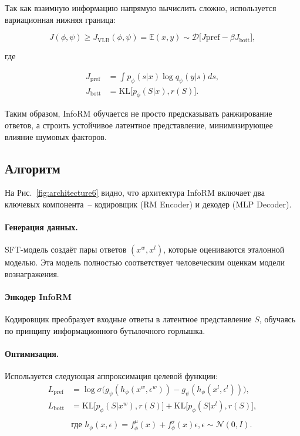Так как взаимную информацию напрямую вычислить сложно, используется вариационная нижняя граница:

\begin{equation}
J(\phi, \psi) \ge J_{\mathrm{VLB}}(\phi, \psi) = \mathbb{E}{(x, y) \sim \mathcal{D}}
\Big[ J{\mathrm{pref}} - \beta J_{\mathrm{bott}} \Big],
\end{equation}

где

\begin{equation}
\begin{aligned}
J_{\mathrm{pref}} &= \int p_{\phi}(s|x) \log q_{\psi}(y|s) ds, \\
J_{\mathrm{bott}} &= \mathrm{KL}\big[p_{\phi}(S|x), r(S)\big].
\end{aligned}
\end{equation}

Таким образом, InfoRM обучается не просто предсказывать ранжирование ответов, а строить устойчивое латентное представление, минимизирующее влияние шумовых факторов.

\subsection{Алгоритм}

На Рис.~\ref{fig:architecture6} видно, что архитектура InfoRM включает два ключевых компонента~-- кодировщик (RM Encoder) и декодер (MLP Decoder).

\paragraph{Генерация данных.}
SFT-модель создаёт пары ответов $(x^w, x^l)$, которые оцениваются эталонной моделью. Эта модель полностью соответствует человеческим оценкам модели вознагражения.

\paragraph{Энкодер InfoRM}
Кодировщик преобразует входные ответы в латентное представление $S$,
обучаясь по принципу информационного бутылочного горлышка.

\paragraph{Оптимизация.}
Используется следующая аппроксимация целевой функции:
\begin{equation}
\begin{aligned}
L_{\mathrm{pref}} &= \log \sigma\Big(g_{\psi}(h_{\phi}(x^w, \epsilon^w)) - g_{\psi}(h_{\phi}(x^l, \epsilon^l))\Big), \\
L_{\mathrm{bott}} &= \mathrm{KL}\big[p_{\phi}(S|x^w), r(S)\big] + \mathrm{KL}\big[p_{\phi}(S|x^l), r(S)\big], \\ \\
& \text{где } h_{\phi}(x, \epsilon) = f_{\phi}^{\mu}(x) + f_{\phi}^{\sigma}(x)\epsilon, \epsilon \sim \mathcal{N}(0, I).
\end{aligned}
\end{equation}

